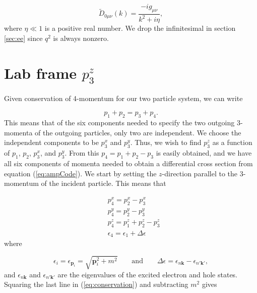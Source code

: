 \documentclass{article}
\begin{document}
\begin{equation}
    \tilde{D}_{0\mu\nu}(k)
    =
    \frac{-ig_{\mu\nu}}{k^2 + i\eta},
\end{equation}
%
where $\eta \ll 1$ is a positive real number.  We drop the infinitesimal in section \ref{sec:ee} since $q^2$ is always nonzero.

\section{Lab frame $p^z_3$}
\label{app:p3z}

Given conservation of 4-momentum for our two particle system, we can write

\begin{equation}
    p_1 + p_2 = p_3 + p_4.
\end{equation}
%
This means that of the six components needed to specify the two outgoing 3-momenta of the outgoing particles, only two are independent.  We choose the independent components to be $p^x_3$ and $p^y_3$.  Thus, we wish to find $p^z_3$ as a function of $p_1$, $p_2$, $p^x_3$, and $p^y_3$.  From this $p_4 = p_1 + p_2 - p_3$ is easily obtained, and we have all six components of momenta needed to obtain a differential cross section from equation (\ref{eq:ampCode}).  We start by setting the $z$-direction parallel to the 3-momentum of the incident particle.  This means that

\begin{equation}
\label{eq:conservation}
    \begin{aligned}
        &p^x_4 = p^x_2 - p^x_3
        \\&p^y_4 = p^y_2 - p^y_3
        \\&p^z_4 = p^z_1 + p^z_2 - p^z_3
        \\&\epsilon_4 = \epsilon_1 + \Delta\epsilon
    \end{aligned}
\end{equation}
%
where

\begin{equation}
    \epsilon_i = \epsilon_{\mathbf{p}_i} = \sqrt{\mathbf{p}_i^2 + m^2}
    \qquad\text{and}\qquad
    \Delta\epsilon = \epsilon_{n\mathbf{k}} - \epsilon_{n'\mathbf{k'}},
\end{equation}
%
and $\epsilon_{n\mathbf{k}}$ and $\epsilon_{n'\mathbf{k'}}$ are the eigenvalues of the excited electron and hole states.  Squaring the last line in (\ref{eq:conservation}) and subtracting $m^2$ gives
\end{document}
